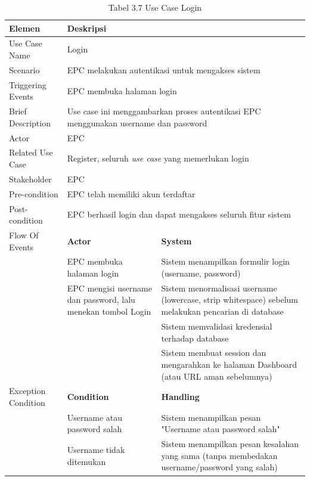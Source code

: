 \begin{longtable}{|p{3.5cm}|p{4.5cm}|p{5cm}|}
\caption{Tabel 3.7 Use Case Login} \label{table:tab3.7} \\
\hline
\textbf{Elemen} & \multicolumn{2}{p{\ucdeskcol}|}{\textbf{Deskripsi}} \\
\hline
\endfirsthead
\endhead
\hline
\endfoot
Use Case Name & \multicolumn{2}{p{\ucdeskcol}|}{Login} \\
\hline
Scenario & \multicolumn{2}{p{\ucdeskcol}|}{EPC melakukan autentikasi untuk mengakses sistem} \\
\hline
Triggering Events & \multicolumn{2}{p{\ucdeskcol}|}{EPC membuka halaman login} \\
\hline
Brief Description & \multicolumn{2}{p{\ucdeskcol}|}{Use case ini menggambarkan proses autentikasi EPC menggunakan username dan password} \\
\hline
Actor & \multicolumn{2}{p{\ucdeskcol}|}{EPC} \\
\hline
Related Use Case & \multicolumn{2}{p{\ucdeskcol}|}{Register, seluruh \textit{use case} yang memerlukan login} \\
\hline
Stakeholder & \multicolumn{2}{p{\ucdeskcol}|}{EPC} \\
\hline
Pre-condition & \multicolumn{2}{p{\ucdeskcol}|}{EPC telah memiliki akun terdaftar} \\
\hline
Post-condition & \multicolumn{2}{p{\ucdeskcol}|}{EPC berhasil login dan dapat mengakses seluruh fitur sistem} \\
\hline
Flow Of Events & \textbf{Actor} & \textbf{System} \\
\hline
 & EPC membuka halaman login & Sistem menampilkan formulir login (username, password) \\
\hline
 & EPC mengisi username dan password, lalu menekan tombol Login & Sistem menormalisasi username (lowercase, strip whitespace) sebelum melakukan pencarian di database \\
\hline
 & & Sistem memvalidasi kredensial terhadap database \\
\hline
 & & Sistem membuat session dan mengarahkan ke halaman Dashboard (atau URL aman sebelumnya) \\
\hline
Exception Condition & \textbf{Condition} & \textbf{Handling} \\
\hline
 & Username atau password salah & Sistem menampilkan pesan "Username atau password salah" \\
\hline
 & Username tidak ditemukan & Sistem menampilkan pesan kesalahan yang sama (tanpa membedakan username/password yang salah) \\
\hline
\end{longtable}


